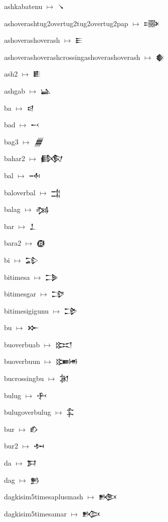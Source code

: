{\noindent ashkabatenu $\mapsto$ {\cufont 𒀺}\par
\noindent ashoverashtug2overtug2tug2overtug2pap $\mapsto$ {\cufont 𒀻}\par
\noindent ashoverashoverash $\mapsto$ {\cufont 𒀼}\par
\noindent ashoverashoverashcrossingashoverashoverash $\mapsto$ {\cufont 𒀽}\par
\noindent ash2 $\mapsto$ {\cufont 𒀾}\par
\noindent ashgab $\mapsto$ {\cufont 𒀿}\par
\noindent ba $\mapsto$ {\cufont 𒁀}\par
\noindent bad $\mapsto$ {\cufont 𒁁}\par
\noindent bag3 $\mapsto$ {\cufont 𒁂}\par
\noindent bahar2 $\mapsto$ {\cufont 𒁃}\par
\noindent bal $\mapsto$ {\cufont 𒁄}\par
\noindent baloverbal $\mapsto$ {\cufont 𒁅}\par
\noindent balag $\mapsto$ {\cufont 𒁆}\par
\noindent bar $\mapsto$ {\cufont 𒁇}\par
\noindent bara2 $\mapsto$ {\cufont 𒁈}\par
\noindent bi $\mapsto$ {\cufont 𒁉}\par
\noindent bitimesa $\mapsto$ {\cufont 𒁊}\par
\noindent bitimesgar $\mapsto$ {\cufont 𒁋}\par
\noindent bitimesigigunu $\mapsto$ {\cufont 𒁌}\par
\noindent bu $\mapsto$ {\cufont 𒁍}\par
\noindent buoverbuab $\mapsto$ {\cufont 𒁎}\par
\noindent buoverbuun $\mapsto$ {\cufont 𒁏}\par
\noindent bucrossingbu $\mapsto$ {\cufont 𒁐}\par
\noindent bulug $\mapsto$ {\cufont 𒁑}\par
\noindent bulugoverbulug $\mapsto$ {\cufont 𒁒}\par
\noindent bur $\mapsto$ {\cufont 𒁓}\par
\noindent bur2 $\mapsto$ {\cufont 𒁔}\par
\noindent da $\mapsto$ {\cufont 𒁕}\par
\noindent dag $\mapsto$ {\cufont 𒁖}\par
\noindent dagkisim5timesaplusmash $\mapsto$ {\cufont 𒁗}\par
\noindent dagkisim5timesamar $\mapsto$ {\cufont 𒁘}\par
}
